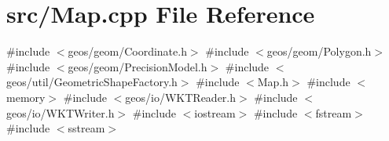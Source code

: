 \section{src/\+Map.cpp File Reference}
\label{_map_8cpp}
{\ttfamily \#include $<$geos/geom/\+Coordinate.\+h$>$}\newline
{\ttfamily \#include $<$geos/geom/\+Polygon.\+h$>$}\newline
{\ttfamily \#include $<$geos/geom/\+Precision\+Model.\+h$>$}\newline
{\ttfamily \#include $<$geos/util/\+Geometric\+Shape\+Factory.\+h$>$}\newline
{\ttfamily \#include $<$Map.\+h$>$}\newline
{\ttfamily \#include $<$memory$>$}\newline
{\ttfamily \#include $<$geos/io/\+W\+K\+T\+Reader.\+h$>$}\newline
{\ttfamily \#include $<$geos/io/\+W\+K\+T\+Writer.\+h$>$}\newline
{\ttfamily \#include $<$iostream$>$}\newline
{\ttfamily \#include $<$fstream$>$}\newline
{\ttfamily \#include $<$sstream$>$}\newline
